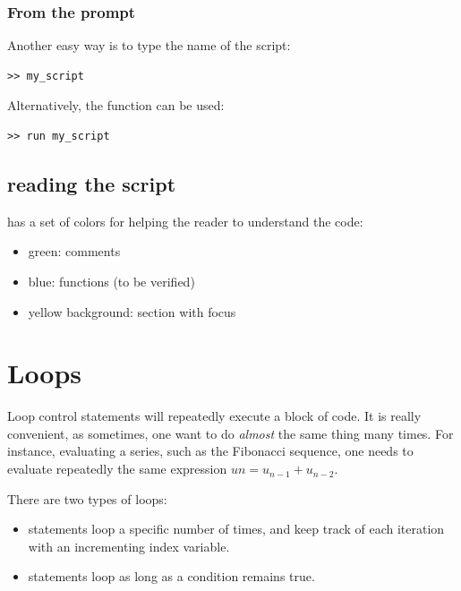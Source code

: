 			\subsubsection{From the prompt}
			Another easy way is to type the name of the script:
\begin{lstlisting}
>> my_script
\end{lstlisting}
			Alternatively, the function  can be used:
\begin{lstlisting}
>> run my_script
\end{lstlisting}

	\subsection{reading the script}
		\matlab has a set of colors for helping the reader to understand the code:
		\begin{itemize}
			\item green: comments
			\item blue: functions (to be verified)
			\item yellow background: section with focus
		\end{itemize}


\section{Loops}
	Loop control statements will repeatedly execute a block of code.
	It is really convenient, as sometimes, one want to do \emph{almost} the same thing many times.
	For instance, evaluating a series, such as the Fibonacci sequence, one needs to evaluate repeatedly the same expression $un = u_{n-1} + u_{n-2}$.




	There are two types of loops:
	\begin{itemize}
		\item {} statements loop a specific number of times, and keep track of each iteration with an incrementing index variable.
		\item {} statements loop as long as a condition remains true.
	\end{itemize}
	
